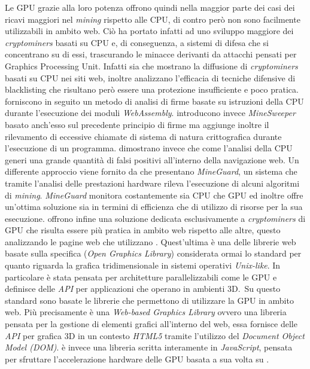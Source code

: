\documentclass[conference]{IEEEtran}
\newcommand\citen[1]{\citeauthor{#1} \citep{#1}}
\newcommand\citetitlen[1]{\citetitle{#1} \citep{#1}}
\begin{document}
Le GPU grazie alla loro potenza offrono quindi nella maggior parte dei casi dei ricavi maggiori nel \emph{mining} rispetto alle CPU, di contro però non sono facilmente utilizzabili in ambito web. Ciò ha portato infatti ad uno sviluppo maggiore dei \emph{cryptominers} basati su CPU e, di conseguenza, a sistemi di difesa che si concentrano su di essi, trascurando le minacce derivanti da attacchi pensati per Graphics Processing Unit. Infatti sia \citen{musch2018web} che \citen{saad2018end} mostrano la diffusione di \emph{cryptominers} basati su CPU nei siti web, inoltre analizzano l'efficacia di tecniche difensive di blacklisting che risultano però essere una protezione insufficiente e poco pratica. \citen{wang2018seismic} forniscono in seguito un metodo di analisi di firme basate su istruzioni della CPU durante l'esecuzione dei moduli \emph{WebAssembly}. \citen{konoth2018minesweeper} introducono invece \emph{MineSweeper} basato anch'esso sul precedente principio di firme ma aggiunge inoltre il rilevamento di eccessive chiamate di sistema di natura crittografica durante l'esecuzione di un programma. \citen{kharraz2019outguard} dimostrano invece che come l'analisi della CPU generi una grande quantità di falsi positivi all'interno della navigazione web. Un differente approccio viene fornito da \citen{tahir2017mining} che presentano \emph{MineGuard}, un sistema che tramite l'analisi delle prestazioni hardware rileva l'esecuzione di alcuni algoritmi di \emph{mining}. \emph{MineGuard} monitora costantemente sia CPU che GPU ed inoltre offre un'ottima soluzione sia in termini di efficienza che di utilizzo di risorse per la sua esecuzione. \citen{belkin2019risks} offrono infine una soluzione dedicata esclusivamente a \emph{cryptominers} di GPU che risulta essere più pratica in ambito web rispetto alle altre, questo analizzando le pagine web che utilizzano \citetitlen{WebGL}. Quest'ultima è una delle librerie web basate sulla specifica  (\emph{Open Graphics Library}) considerata ormai lo standard per quanto riguarda la grafica tridimensionale in sistemi operativi \emph{Unix-like}. In particolare  è stata pensata per architetture parallelizzabili come le GPU e definisce delle \emph{API} per applicazioni che operano in ambienti 3D.\ Su questo standard sono basate le librerie che permettono di utilizzare la GPU in ambito web. Più precisamente  è una \emph{Web-based Graphics Library} ovvero una libreria pensata per la gestione di elementi grafici all'interno del web, essa fornisce delle \emph{API} per grafica 3D in un contesto \emph{HTML5} tramite l'utilizzo del \emph{Document Object Model (DOM)}.  è invece una libreria scritta interamente in \emph{JavaScript}, pensata per sfruttare l'accelerazione hardware delle GPU basata a sua volta su .\\
\end{document}
